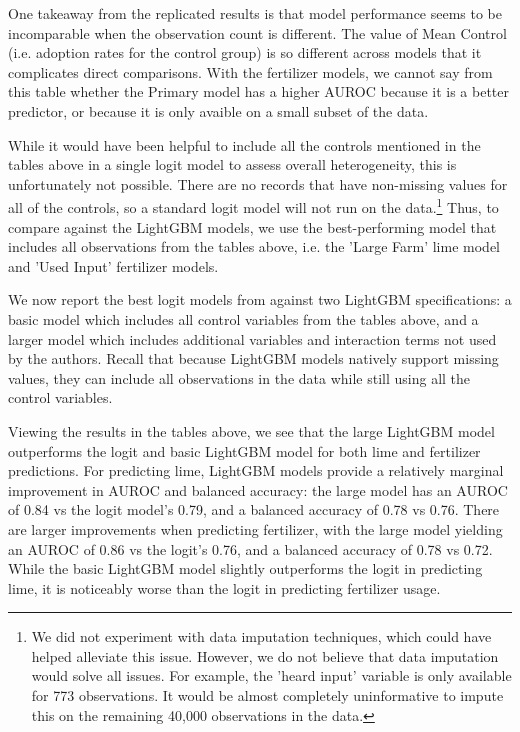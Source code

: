 \documentclass[12pt]{article}
\begin{document}
One takeaway from the replicated results is that model performance seems to be incomparable when the observation count is different. The value of Mean Control (i.e. adoption rates for the control group) is so different across models that it complicates direct comparisons. With the fertilizer models, we cannot say from this table whether the Primary model has a higher AUROC because it is a better predictor, or because it is only avaible on a small subset of the data.

While it would have been helpful to include all the controls mentioned in the tables above in a single logit model to assess overall heterogeneity, this is unfortunately not possible. There are no records that have non-missing values for all of the controls, so a standard logit model will not run on the data.\footnote{We did not experiment with data imputation techniques, which could have helped alleviate this issue. However, we do not believe that data imputation would solve all issues. For example, the 'heard input' variable is only available for 773 observations. It would be almost completely uninformative to impute this on the remaining 40,000 observations in the data.} Thus, to compare against the LightGBM models, we use the best-performing model that includes all observations from the tables above, i.e. the 'Large Farm' lime model and 'Used Input' fertilizer models.

We now report the best logit models from \textcite{fabregas_digital_2025} against two LightGBM specifications: a basic model which includes all control variables from the tables above, and a larger model which includes additional variables and interaction terms not used by the authors. Recall that because LightGBM models natively support missing values, they can include all observations in the data while still using all the control variables.




Viewing the results in the tables above, we see that the large LightGBM model outperforms the logit and basic LightGBM model for both lime and fertilizer predictions. For predicting lime, LightGBM models provide a relatively marginal improvement in AUROC and balanced accuracy: the large model has an AUROC of 0.84 vs the logit model's 0.79, and a balanced accuracy of 0.78 vs 0.76. There are larger improvements when predicting fertilizer, with the large model yielding an AUROC of 0.86 vs the logit's 0.76, and a balanced accuracy of 0.78 vs 0.72. While the basic LightGBM model slightly outperforms the logit in predicting lime, it is noticeably worse than the logit in predicting fertilizer usage.
\end{document}
